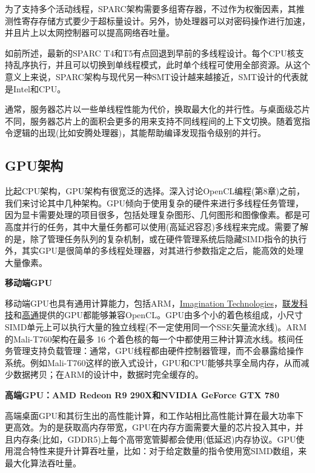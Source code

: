 为了支持多个活动线程，SPARC架构需要多组寄存器，不过作为权衡因素，其推测性寄存存储方式要少于超标量设计。另外，协处理器可以对密码操作进行加速，并且片上以太网控制器可以提高网络吞吐量。

如前所述，最新的SPARC T4和T5有点回退到早前的多线程设计。每个CPU核支持乱序执行，并且可以切换到单线程模式，此时单个线程可使用全部资源。从这个意义上来说，SPARC架构与现代另一种SMT设计越来越接近，SMT设计的代表就是Intel和CPU。

通常，服务器芯片以一些单线程性能为代价，换取最大化的并行性。与桌面级芯片不同，服务器芯片上的面积会更多的用来支持不同线程间的上下文切换。随着宽指令逻辑的出现(比如安腾处理器)，其能帮助编译发现指令级别的并行。

\subsection{GPU架构}

比起CPU架构，GPU架构有很宽泛的选择。深入讨论OpenCL编程(第8章)之前，我们来讨论其中几种架构。GPU倾向于使用复杂的硬件来进行多线程任务管理，因为显卡需要处理的项目很多，包括处理复杂图形、几何图形和图像像素。都是可高度并行的任务，其中大量任务都可以使用(高延迟容忍)多线程来完成。需要了解的是，除了管理任务队列的复杂机制，或在硬件管理系统后隐藏SIMD指令的执行外，其实GPU是很简单的多线程处理器，对其进行参数指定之后，能高效的处理大量像素。

\textbf{移动端GPU}

移动端GPU也具有通用计算能力，包括ARM，\href{https://zh.wikipedia.org/wiki/Imagination\_Technologies}{Imagination Technologies}，\href{https://zh.wikipedia.org/wiki/\%E8\%81\%AF\%E7\%99\%BC\%E7\%A7\%91\%E6\%8A\%80}{联发科技}和\href{https://zh.wikipedia.org/wiki/\%E9\%AB\%98\%E9\%80\%9A}{高通}提供的GPU都能够兼容OpenCL。GPU由多个小的着色核组成，小尺寸SIMD单元上可以执行大量的独立线程(不一定使用同一个SSE矢量流水线)。ARM的Mali-T760架构在最多 16 个着色核的每一个中都使用三种计算流水线。核间任务管理支持负载管理：通常，GPU线程都由硬件控制器管理，而不会暴露给操作系统。例如Mali-T760这样的嵌入式设计，GPU和CPU能够共享全局内存，从而减少数据拷贝；在ARM的设计中，数据时完全缓存的。

\textbf{高端GPU：AMD Redeon R9 290X和NVIDIA GeForce GTX 780}

高端桌面GPU和其衍生出的高性能计算，和工作站相比高性能计算在最大功率下更高效。为的是获取高内存带宽，GPU在内存方面需要大量的芯片投入其中，并且内存条(比如，GDDR5)上每个高带宽管脚都会使用(低延迟)内存协议。GPU使用混合特性来提升计算吞吐量，比如：对于给定数量的指令使用宽SIMD数组，来最大化算法吞吐量。

